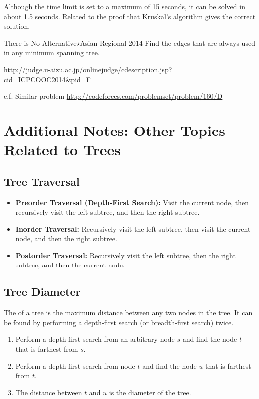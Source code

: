 Although the time limit is set to a maximum of 15 seconds, it can be solved in about 1.5 seconds.
Related to the proof that Kruskal's algorithm gives the correct solution.

\begin{pbox}{There is No Alternative$\star$}{Asian Regional 2014}
Find the edges that are always used in any minimum spanning tree.

  \url{http://judge.u-aizu.ac.jp/onlinejudge/cdescription.jsp?cid=ICPCOOC2014&pid=F}

c.f. Similar problem \url{http://codeforces.com/problemset/problem/160/D}
\end{pbox}
\section{Additional Notes: Other Topics Related to Trees}

\subsection{Tree Traversal}
\begin{itemize}
    \item \textbf{Preorder Traversal (Depth-First Search):} Visit the current node, then recursively visit the left subtree, and then the right subtree.
    \item \textbf{Inorder Traversal:} Recursively visit the left subtree, then visit the current node, and then the right subtree.
    \item \textbf{Postorder Traversal:} Recursively visit the left subtree, then the right subtree, and then the current node.
\end{itemize}

\subsection{Tree Diameter}
The  of a tree is the maximum distance between any two nodes in the tree.
It can be found by performing a depth-first search (or breadth-first search) twice.
\begin{enumerate}
    \item Perform a depth-first search from an arbitrary node $s$ and find the node $t$ that is farthest from $s$.
    \item Perform a depth-first search from node $t$ and find the node $u$ that is farthest from $t$.
    \item The distance between $t$ and $u$ is the diameter of the tree.
\end{enumerate}

